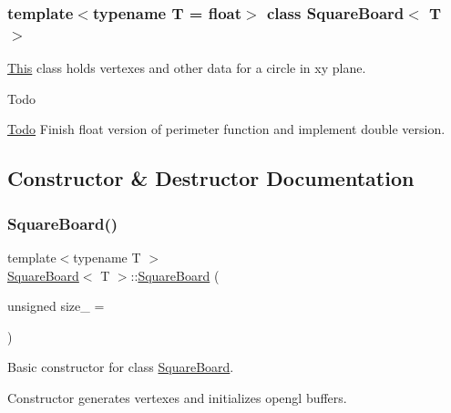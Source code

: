 \subsubsection*{template$<$typename T = float$>$\newline
class Square\+Board$<$ T $>$}

\mbox{\hyperlink{classThis}{This}} class holds vertexes and other data for a circle in xy plane. 

\begin{DoxyRefDesc}{Todo}
\item[\mbox{\hyperlink{todo__todo000002}{Todo}}]Finish float version of perimeter function and implement double version. \end{DoxyRefDesc}


\subsection{Constructor \& Destructor Documentation}
\mbox{\label{classSquareBoard_aa7aac1a02a00ce9ad0c9441fffa71e02}} 
\subsubsection{\texorpdfstring{Square\+Board()}{SquareBoard()}\hspace{0.1cm}{\footnotesize\ttfamily [1/6]}}
{\footnotesize\ttfamily template$<$typename T $>$ \\
\mbox{\hyperlink{classSquareBoard}{Square\+Board}}$<$ T $>$\+::\mbox{\hyperlink{classSquareBoard}{Square\+Board}} (\begin{DoxyParamCaption}\item[{unsigned}]{size\+\_\+ = {} }\end{DoxyParamCaption})}



Basic constructor for class \mbox{\hyperlink{classSquareBoard}{Square\+Board}}. 

Constructor generates vertexes and initializes opengl buffers. \mbox{\label{classSquareBoard_a23c495a2419aded87c0b2803de409b5e}} 
